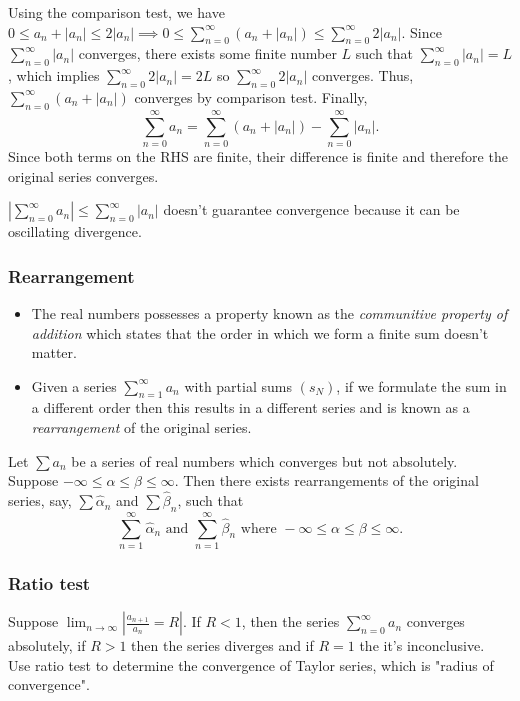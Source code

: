 \documentclass[class=article,crop=false]{standalone}
\begin{document}
\begin{eg}
\begin{prf}
Using the comparison test, we have
$0 \leq a_n + |a_n| \leq 2|a_n| \implies 0 \leq \sum_{ n=0}^{\infty} (a_n+|a_n|) \leq \sum_{ n=0}^{\infty} 2|a_n|$. Since $\sum_{ n=0}^{\infty} |a_n|$ converges, there exists some finite number $L$ such that $\sum_{ n=0}^{\infty} |a_n|=L$, which implies $\sum_{ n=0}^{\infty} 2|a_n| = 2L$ so $\sum_{ n=0}^{\infty} 2|a_n|$ converges. Thus, $\sum_{ n=0}^{\infty} (a_n+|a_n|)$ converges by comparison test. Finally,
\[
	\sum_{ n=0}^{\infty} a_n = \sum_{ n=0}^{\infty} (a_n+|a_n|) - \sum_{ n=0}^{\infty} |a_n|
.\] 
Since both terms on the RHS are finite, their difference is finite and therefore the original series converges.
\end{prf}
\end{eg}

\begin{note}[]
	$\left| \sum_{ n=0}^{\infty} a_n \right| \leq \sum_{ n=0}^{\infty} |a_n| $ doesn't guarantee convergence because it can be oscillating divergence.
\end{note}

\subsubsection{Rearrangement}
\begin{itemize}
	\item The real numbers possesses a property known as the \emph{communitive property of addition} which states that the order in which we form a finite sum doesn't matter.
	\item Given a series $\sum_{ n=1}^{\infty} a_n$ with partial sums $(s_N)$, if we formulate the sum in a different order then this results in a different series and is known as a \emph{rearrangement} of the original series.
\end{itemize}

\begin{thm}[]
Let $ \sum a_n$ be a series of real numbers which converges but not absolutely. Suppose $-\infty \leq \alpha\leq \beta \leq \infty$. Then there exists rearrangements of the original series, say, $\sum \hat{\alpha}_n$ and $\sum \hat{\beta}_n$, such that
\[
\sum_{ n=1}^{\infty} \hat{\alpha}_n \text{ and } \sum_{ n=1}^{\infty} \hat{\beta}_n \text{ where } -\infty\leq \alpha \leq \beta \leq \infty  
.\] 
\end{thm}

\subsubsection{Ratio test}
Suppose $\lim_{ n \to \infty} \left| \frac{a_{n+1}}{a_n} =R \right| $. If $R<1$, then the series  $\sum_{ n=0}^{\infty} a_n$ converges absolutely, if $R>1$ then the series diverges and if  $R=1$ the it's inconclusive.\\

Use ratio test to determine the convergence of Taylor series, which is "radius of convergence".
\end{document}
